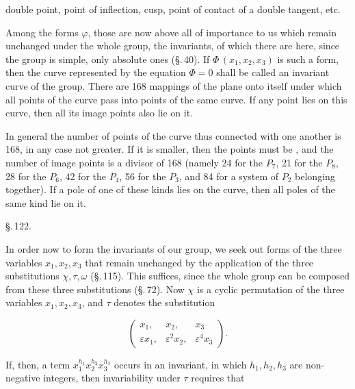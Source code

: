 
double point, point of inflection, cusp, point of contact of a double tangent, etc.

Among the forms $\varphi$, those are now above all of importance to us which remain unchanged under the whole group, the invariants, of which there are here, since the group is simple, only absolute ones (\S.\,40). If $\Phi\,(x_1, x_2, x_3)$ is such a form, then the curve represented by the equation $\Phi = 0$ shall be called an invariant curve of the group. There are 168 mappings of the plane onto itself under which all points of the curve pass into points of the same curve. If any point lies on this curve, then all its image points also lie on it.

In general the number of points of the curve thus connected with one another is 168, in any case not greater. If it is smaller, then the points must be , and the number of image points is a divisor of 168 (namely 24 for the $P_7$, 21 for the $P_8$, 28 for the $P_6$, 42 for the $P_4$, 56 for the $P_3$, and 84 for a system of $P_2$ belonging together). If a pole of one of these kinds lies on the curve, then all poles of the same kind lie on it.

\begin{center}
\S.\,122.\\
\end{center}

In order now to form the invariants of our group, we seek out forms of the three variables $x_1, x_2, x_3$ that remain unchanged by the application of the three substitutions $\chi, \tau, \omega$ (\S.\,115). This suffices, since the whole group can be composed from these three substitutions (\S.\,72). Now $\chi$ is a cyclic permutation of the three variables $x_1, x_2, x_3$, and $\tau$ denotes the substitution

\[
\begin{pmatrix} x_1, & x_2, & x_3 \\ \varepsilon x_1, & \varepsilon^2 x_2, & \varepsilon^4 x_3 \end{pmatrix}.
\]

If, then, a term $x_1^{h_1} x_2^{h_2} x_3^{h_3}$ occurs in an invariant, in which $h_1, h_2, h_3$ are non-negative integers, then invariability under $\tau$ requires that

